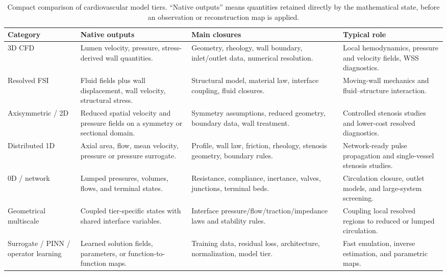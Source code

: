 \begin{table}[!htb]
    \centering
    \scriptsize
    \caption{Compact comparison of cardiovascular model tiers. ``Native
    outputs'' means quantities retained directly by the mathematical state,
    before an observation or reconstruction map is applied.}
    \label{tab:model-hierarchy-comparison}
    \begin{tabularx}{\textwidth}{@{}
        >{\raggedright\arraybackslash}p{}
        >{\raggedright\arraybackslash}p{}
        >{\raggedright\arraybackslash}p{}
        >{\raggedright\arraybackslash}X@{}}
        \toprule
        \textbf{Category}
            & \textbf{Native outputs}
            & \textbf{Main closures}
            & \textbf{Typical role} \\
        \midrule
        3D CFD
            & Lumen velocity, pressure, stress-derived wall quantities.
            & Geometry, rheology, wall boundary, inlet/outlet data, numerical
            resolution.
            & Local hemodynamics, pressure and velocity fields, WSS diagnostics. \\
        Resolved FSI
            & Fluid fields plus wall displacement, wall velocity, structural stress.
            & Structural model, material law, interface coupling, fluid closures.
            & Moving-wall mechanics and fluid--structure interaction. \\
        Axisymmetric / 2D
            & Reduced spatial velocity and pressure fields on a symmetry or
            sectional domain.
            & Symmetry assumptions, reduced geometry, boundary data, wall treatment.
            & Controlled stenosis studies and lower-cost resolved diagnostics. \\
        Distributed 1D
            & Axial area, flow, mean velocity, pressure or pressure surrogate.
            & Profile, wall law, friction, rheology, stenosis geometry, boundary
            rules.
            & Network-ready pulse propagation and single-vessel stenosis studies. \\
        0D / network
            & Lumped pressures, volumes, flows, and terminal states.
            & Resistance, compliance, inertance, valves, junctions, terminal beds.
            & Circulation closure, outlet models, and large-system screening. \\
        Geometrical multiscale
            & Coupled tier-specific states with shared interface variables.
            & Interface pressure/flow/traction/impedance laws and stability rules.
            & Coupling local resolved regions to reduced or lumped circulation. \\
        Surrogate / PINN / operator learning
            & Learned solution fields, parameters, or function-to-function maps.
            & Training data, residual loss, architecture, normalization, model tier.
            & Fast emulation, inverse estimation, and parametric maps. \\
        \bottomrule
    \end{tabularx}
\end{table}

